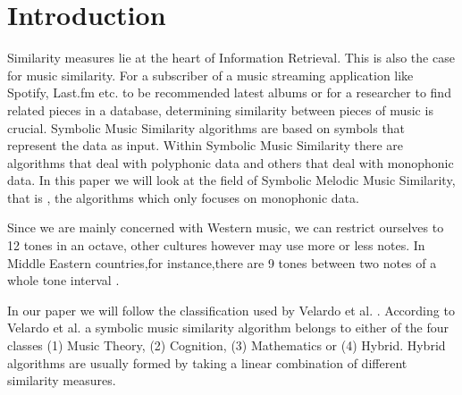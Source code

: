 \documentclass{llncs}
\begin{document}
	\section{Introduction}
		Similarity measures lie at the heart of Information Retrieval. This is also the case for music similarity. For a subscriber of a music streaming application like Spotify, Last.fm etc. to be recommended latest albums or for a researcher to find related pieces in a database, determining similarity between pieces of music is crucial. Symbolic Music Similarity algorithms are based on symbols that represent the data as input. Within Symbolic Music Similarity there are algorithms that deal with polyphonic data and others that deal with monophonic data. In this paper we will look at the field of Symbolic Melodic Music Similarity, that is , the algorithms which only focuses on monophonic data. 

        Since we are mainly concerned with Western music, we can restrict ourselves to 12 tones in an octave, other cultures however may use more or less notes. In Middle Eastern countries,for instance,there are 9 tones between two notes of a whole tone interval \cite{six}.

		In our paper we will follow the classification used by Velardo et al. \cite{two}. According to Velardo et al. a symbolic music similarity algorithm belongs to either of the four classes (1) Music Theory, (2) Cognition, (3) Mathematics or (4) Hybrid. Hybrid algorithms are usually formed by taking a linear combination of different similarity measures.
		
\end{document}
